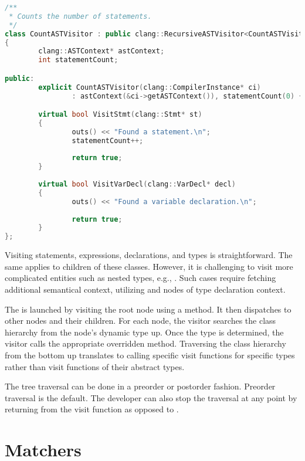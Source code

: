 \begin{lstlisting}[caption=CountASTVisitor., language=C++, 
label={lst:countvisitor}]
/**
 * Counts the number of statements.
 */
class CountASTVisitor : public clang::RecursiveASTVisitor<CountASTVisitor>
{
        clang::ASTContext* astContext;
        int statementCount;

public:
        explicit CountASTVisitor(clang::CompilerInstance* ci)
                : astContext(&ci->getASTContext()), statementCount(0) { }

        virtual bool VisitStmt(clang::Stmt* st)
        {
                outs() << "Found a statement.\n";
				statementCount++;
				
                return true;
        }
		
		virtual bool VisitVarDecl(clang::VarDecl* decl)
        {
                outs() << "Found a variable declaration.\n";
				
                return true;
        }
};
\end{lstlisting}

Visiting statements, expressions, declarations, 
and types is straightforward. 
The same applies to children of these classes. 
However, it is challenging to visit more complicated entities 
such as nested types, e.g., . 
Such cases require fetching additional semantical context, 
utilizing  and nodes of type declaration context.


The  is launched by visiting the root node using 
a  method. 
It then dispatches to other nodes and their children. 
For each node, the visitor searches the class hierarchy from 
the node's dynamic type up. 
Once the type is determined, the visitor calls the appropriate 
overridden  method. 
Traversing the class hierarchy from the bottom up 
translates to calling specific visit functions for specific types 
rather than visit functions of their abstract types.

The tree traversal can be done in a preorder or postorder fashion. 
Preorder traversal is the default. The developer can also stop
the traversal at any point by returning  from
the visit function as opposed to .

\section{Matchers}

